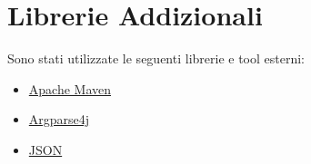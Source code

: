 \section{Librerie Addizionali}
Sono stati utilizzate le seguenti librerie e tool esterni:
\begin{itemize}
	\item\href{https://maven.apache.org/}{Apache Maven}
	\item\href{https://argparse4j.github.io/}{Argparse4j}
	\item\href{https://mvnrepository.com/artifact/org.json/json}{JSON}
\end{itemize}